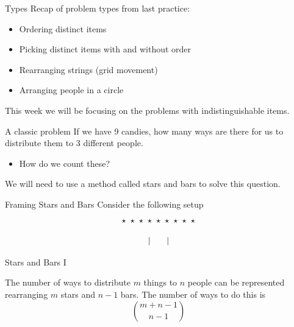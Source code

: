 \documentclass[aspectratio=169,xcolor=dvipsnames]{beamer}
\begin{document}
\begin{frame}[t]{Types}
    Recap of problem types from last practice:
    \begin{itemize}
        \item Ordering distinct items
        \item Picking distinct items with and without order
        \item Rearranging strings (grid movement)
        \item Arranging people in a circle
    \end{itemize}
    
    \vspace{2.067cm}
    
    This week we will be focusing on the problems with indistinguishable items.
\end{frame}

\begin{frame}[t]{A classic problem}
    If we have 9 candies, how many ways are there for us to distribute them to 3 different people.

    \begin{itemize}
        \item How do we count these?
    \end{itemize}
    
    \vspace{4cm}
    
    We will need to use a method called stars and bars to solve this question.
\end{frame}

\begin{frame}[t]{Framing Stars and Bars}
    Consider the following setup
    \[
        \star\hspace{0.1cm}
        \star\hspace{0.1cm}
        \star\hspace{0.1cm}
        \star\hspace{0.1cm}
        \star\hspace{0.1cm}
        \star\hspace{0.1cm}
        \star\hspace{0.1cm}
        \star\hspace{0.1cm}
        \star
    \]
    
    \[|\hspace{0.67cm}|\]
\end{frame}

\begin{frame}[t]{Stars and Bars I}
    \begin{definition}
    The number of ways to distribute $m$ things to $n$ people can be represented rearranging $m$ stars and $n-1$ bars. The number of ways to do this is
    \[
    \binom{m+n-1}{n-1}
    \]
    \end{definition}
\end{frame}
\end{document}
